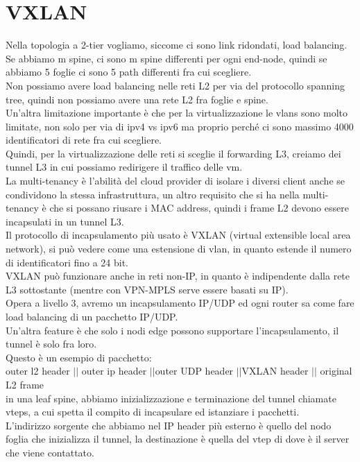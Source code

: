 \documentclass[12pt, oneside]{extbook} %
\begin{document}
\section{VXLAN}
Nella topologia a 2-tier vogliamo, siccome ci sono link ridondati, load balancing.
\\Se abbiamo m spine, ci sono m spine differenti per ogni end-node, quindi se abbiamo 5 foglie ci sono 5 path differenti fra cui scegliere.
\\Non possiamo avere load balancing nelle reti L2 per via del protocollo spanning tree, quindi non possiamo avere una rete L2 fra foglie e spine.
\\Un'altra limitazione importante è che per la virtualizzazione le vlans sono molto limitate, non solo per via di ipv4 vs ipv6 ma proprio perché ci sono massimo 4000 identificatori di rete fra cui scegliere.
\\Quindi, per la virtualizzazione delle reti si sceglie il forwarding L3, creiamo dei tunnel L3 in cui possiamo redirigere il traffico delle vm.
\\La multi-tenancy è l'abilità del cloud provider di isolare i diversi client anche se condividono la stessa infrastruttura, un altro requisito che si ha nella multi-tenancy è che si possano riusare i MAC address, quindi i frame L2 devono essere incapsulati in un tunnel L3.
\\Il protocollo di incapsulamento più usato è VXLAN (virtual extensible local area network), si può vedere come una estensione di vlan, in quanto estende il numero di identificatori fino a 24 bit.
\\VXLAN può funzionare anche in reti non-IP, in quanto è indipendente dalla rete L3 sottostante (mentre con VPN-MPLS serve essere basati su IP).
\\Opera a livello 3, avremo un incapsulamento IP/UDP ed ogni router sa come fare load balancing di un pacchetto IP/UDP.
\\Un'altra feature è che solo i nodi edge possono supportare l'incapsulamento, il tunnel è solo fra loro.
\\Questo è un esempio di pacchetto:\\
outer l2 header $||$ outer ip header $||$outer UDP header $||$VXLAN header $||$ original L2 frame\\
in una leaf spine, abbiamo inizializzazione e terminazione del tunnel chiamate vteps, a cui spetta il compito di incapsulare ed istanziare i pacchetti.
\\L'indirizzo sorgente che abbiamo nel IP header più esterno è quello del nodo foglia che inizializza il tunnel, la destinazione è quella del vtep di dove è il server che viene contattato.
\end{document}

